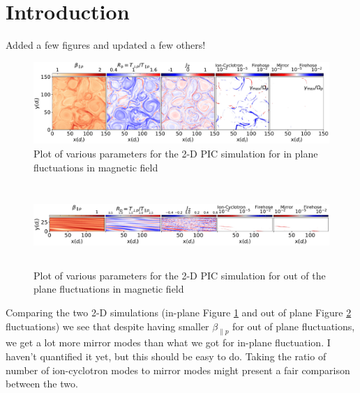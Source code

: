 \documentclass[column]{aastex62}
\begin{document}
	\section{Introduction} \label{sec:intro}
	
        Added a few figures and updated a few others!		

		\begin{figure}
			\begin{center}
				\includegraphics[width=1.05\textwidth,
				angle=0]{b_r_j_gamma_all_gamma_k_149p6_hb.pdf}
				\caption{Plot of various parameters for the 2-D PIC simulation for in plane fluctuations in magnetic field}
				\label{fig:brj1}
			\end{center}
		\end{figure}

        \begin{figure}
			\begin{center}
				\includegraphics[width=1.05\textwidth, height=3.1cm,
				angle=0]{b_r_j_gamma_all_kaw_ti0p6te0p6_Time6000wpe_2.pdf}
				\caption{Plot of various parameters for the 2-D PIC simulation for out of the plane fluctuations in magnetic field}
				\label{fig:brj2}
			\end{center}
		\end{figure}

    Comparing the two 2-D simulations (in-plane Figure \ref{fig:brj1} and out of plane Figure \ref{fig:brj2} fluctuations) we see that despite having smaller $\beta_{\parallel p}$ for out of plane fluctuations, we get a lot more mirror modes than what we got for in-plane fluctuation. I haven't quantified it yet, but this should be easy to do. Taking the ratio of number of ion-cyclotron modes to mirror modes might present a fair comparison between the two.
    
\end{document}
